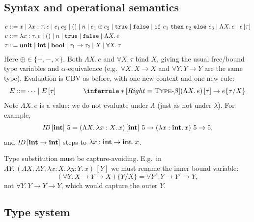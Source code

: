 \subsection{Syntax and operational semantics}
\begin{align*}
e &::= x \mid \lambda x : \tau.\, e \mid e_1\, e_2 \mid () \mid n \mid e_1 \oplus e_2
      \mid \ttkw{true} \mid \ttkw{false} \mid \ttkw{if}\ e_1\ \ttkw{then}\ e_2\ \ttkw{else}\ e_3
      \mid \Lambda X.\, e \mid e\,[\tau] \\
v &::= \lambda x : \tau.\, e \mid () \mid n \mid \ttkw{true} \mid \ttkw{false} \mid \Lambda X.\, e \\
\tau &::= \kw{unit} \mid \kw{int} \mid \kw{bool} \mid \tau_1 \to \tau_2 \mid X \mid \forall X.\, \tau
\end{align*}
Here $\oplus \in \{+, -, \times\}$. Both $\Lambda X.\, e$ and $\forall X.\, \tau$ bind
$X$, giving the usual free/bound type variables and $\alpha$-equivalence (e.g.\
$\forall X.\, X \to X$ and $\forall Y.\, Y \to Y$ are the same type). Evaluation is
CBV as before, with one new context and one new rule:
\[
E ::= \cdots \mid E\,[\tau]
\qquad\qquad
\inferrule*[Right=\textsc{Type-$\beta$}]
  { }
  {(\Lambda X.\, e)\,[\tau] \to \tsub{e}{\tau}{X}}
\]
Note $\Lambda X.\, e$ is a value: we do not evaluate under $\Lambda$ (just as not
under $\lambda$). For example,
\[
\mathit{ID}\,[\mathbf{int}]\ 5 = (\Lambda X.\, \lambda x : X.\, x)\,[\mathbf{int}]\ 5
  \to (\lambda x : \mathbf{int}.\, x)\ 5 \to 5,
\]
and $\mathit{ID}\,[\mathbf{int} \to \mathbf{int}]$ steps to $\lambda x : \mathbf{int} \to \mathbf{int}.\, x$.

Type substitution must be capture-avoiding. E.g.\ in
$\Lambda Y.\, (\Lambda X.\, \Lambda Y.\, \lambda x : X.\, \lambda y : Y.\, x)\,[Y]$
we must rename the inner bound variable:
\[
(\forall Y.\, X \to Y \to X)\{Y/X\} = \forall Y'.\, Y \to Y' \to Y,
\]
not $\forall Y.\, Y \to Y \to Y$, which would capture the outer $Y$.

\subsection{Type system}

